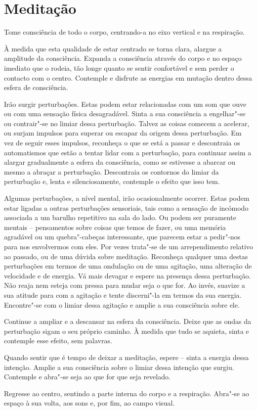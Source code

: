 
\chapter{Meditação}


Tome consciência de todo o corpo, centrando-a no eixo vertical e na respiração.

À medida que esta qualidade de estar centrado se torna clara, alargue a amplitude da consciência. Expanda a consciência através do corpo e no espaço imediato que o rodeia, tão longe quanto se sentir confortável e sem perder o contacto com o centro. Contemple e disfrute as energias em mutação dentro dessa esfera de consciência.

Irão surgir perturbações. Estas podem estar relacionadas com um som que ouve ou com uma sensação física desagradável. Sinta a sua consciência a engelhar"-se ou contrair"-se no limiar dessa perturbação. Talvez as coisas comecem a acelerar, ou surjam impulsos para superar ou escapar da origem dessa perturbação. Em vez de seguir esses impulsos, reconheça o que se está a passar e descontraia os automatismos que estão a tentar lidar com a perturbação, para continuar assim a alargar gradualmente a esfera da consciência, como se estivesse a abarcar ou mesmo a abraçar a perturbação. Descontraia os contornos do limiar da perturbação e, lenta e silenciosamente, contemple o efeito que isso tem.

Algumas perturbações, a nível mental, irão ocasionalmente ocorrer. Estas podem estar ligadas a outras perturbações sensoriais, tais como a sensação de incómodo associada a um barulho repetitivo na sala do lado. Ou podem ser puramente mentais -- pensamentos sobre coisas que temos de fazer, ou uma memória agradável ou um quebra"-cabeças interessante, que parecem estar a pedir"-nos para nos envolvermos com eles. Por vezes trata"-se de um arrependimento relativo ao passado, ou de uma dúvida sobre meditação. Reconheça qualquer uma destas perturbações em termos de uma ondulação ou de uma agitação, uma alteração de velocidade e de energia. Vá mais devagar e espere na presença dessa perturbação. Não reaja nem esteja com pressa para mudar seja o que for. Ao invés, suavize a sua atitude para com a agitação e tente discerni"-la em termos da sua energia. Encontre"-se com o limiar dessa agitação e amplie a sua consciência sobre ele.

Continue a ampliar e a descansar na esfera da consciência. Deixe que as ondas da perturbação sigam o seu próprio caminho. À medida que tudo se aquieta, sinta e contemple esse efeito, sem palavras.

Quando sentir que é tempo de deixar a meditação, espere -- sinta a energia dessa intenção. Amplie a sua consciência sobre o limiar dessa intenção que surgiu. Contemple e abra"-se seja ao que for que seja revelado.

Regresse ao centro, sentindo a parte interna do corpo e a respiração. Abra"-se ao espaço à sua volta, aos sons e, por fim, ao campo visual.
